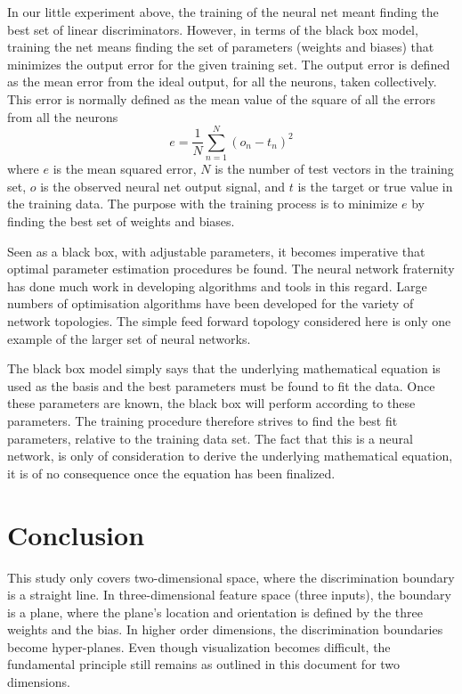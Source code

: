 In our little experiment above, the training of the neural net meant finding the best set of  linear discriminators.  However, in terms of the black box model, training the net means finding the set of parameters (weights and biases) that minimizes the output error for the given training set.  The output error is defined as the mean error from the ideal output, for all the neurons, taken collectively.  This error is normally defined as the mean value of the square of all the errors from all the neurons
\begin{equation}
e = \frac{1}{N}\sum^N_{n=1}(o_n-t_n)^2
\end{equation}
where $e$  is the mean squared error,  $N$  is the number of test vectors in the training set,  $o$  is the observed neural net output signal, and $t$  is the target or true value in the training data.  The purpose with the training process is to minimize $e$  by finding the best set of weights and biases.  

Seen as a black box, with adjustable parameters, it becomes imperative that optimal parameter estimation procedures be found.  The neural network fraternity has done much work in developing algorithms and tools in this regard.  Large numbers of optimisation algorithms have been developed for the variety of network topologies.  The simple feed forward topology considered here is only one example of the larger set of neural networks.

The black box model simply says that the underlying mathematical equation is used as the basis and the best parameters must be found to fit the data.  Once these parameters are known, the black box will perform according to these parameters.  The training procedure therefore strives to find the best fit parameters, relative to the training data set.  The fact that this is a neural network, is only of consideration to derive the underlying mathematical equation, it is of no consequence once the equation has been finalized.  

\section{Conclusion}

This study only covers two-dimensional space, where the discrimination boundary is a straight line.  In three-dimensional feature space (three inputs), the boundary is a plane, where the plane's location and orientation is defined by the three weights and the bias.  In higher order dimensions, the discrimination boundaries become hyper-planes.  Even though visualization becomes difficult, the fundamental principle still remains as outlined in this document for two dimensions.

